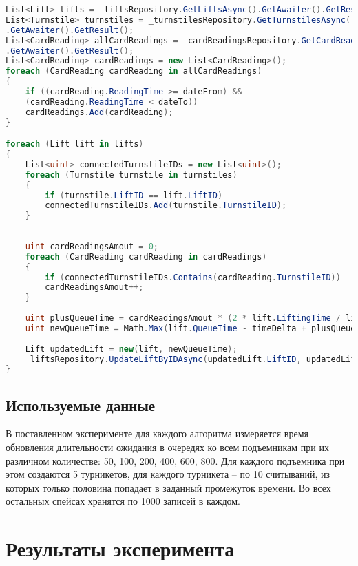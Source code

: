 \captionsetup{justification=centering,singlelinecheck=off}
\begin{lstlisting}[label=lst:upd4, caption=Четвертый вариант алгоритма обновления времени ожидания в очередях к подъемникам, language=csharp]
    List<Lift> lifts = _liftsRepository.GetLiftsAsync().GetAwaiter().GetResult();
List<Turnstile> turnstiles = _turnstilesRepository.GetTurnstilesAsync()
.GetAwaiter().GetResult();
List<CardReading> allCardReadings = _cardReadingsRepository.GetCardReadingsAsync()
.GetAwaiter().GetResult();
List<CardReading> cardReadings = new List<CardReading>();
foreach (CardReading cardReading in allCardReadings)
{
	if ((cardReading.ReadingTime >= dateFrom) &&
	(cardReading.ReadingTime < dateTo))
	cardReadings.Add(cardReading);
}

foreach (Lift lift in lifts)
{
	List<uint> connectedTurnstileIDs = new List<uint>();
	foreach (Turnstile turnstile in turnstiles)
	{
		if (turnstile.LiftID == lift.LiftID)
		connectedTurnstileIDs.Add(turnstile.TurnstileID);
	}
	
	
	uint cardReadingsAmout = 0;
	foreach (CardReading cardReading in cardReadings)
	{
		if (connectedTurnstileIDs.Contains(cardReading.TurnstileID))
		cardReadingsAmout++;
	}
	
	uint plusQueueTime = cardReadingsAmout * (2 * lift.LiftingTime / lift.SeatsAmount);
	uint newQueueTime = Math.Max(lift.QueueTime - timeDelta + plusQueueTime, 0);
	
	Lift updatedLift = new(lift, newQueueTime);
	_liftsRepository.UpdateLiftByIDAsync(updatedLift.LiftID, updatedLift.LiftName, updatedLift.IsOpen, updatedLift.SeatsAmount, updatedLift.LiftingTime).GetAwaiter().GetResult();
}
\end{lstlisting}

\subsection{Используемые данные}

В поставленном эксперименте для каждого алгоритма измеряется время обновления длительности ожидания в очередях ко всем подъемникам при их различном количестве: 50, 100, 200, 400, 600, 800. Для каждого подъемника при этом создаются 5 турникетов,  для каждого турникета -- по 10 считываний, из которых только половина попадает в заданный промежуток времени. Во всех остальных спейсах хранятся по 1000 записей в каждом.



\section{Результаты эксперимента}

